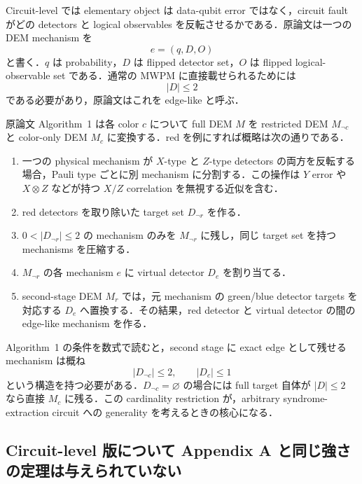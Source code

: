 \documentclass[a4paper,11pt]{ltjsarticle}
\begin{document}
Circuit-level では elementary object は data-qubit error ではなく，circuit fault がどの detectors と logical observables を反転させるかである．原論文は一つの DEM mechanism を
\begin{equation}
  e=(q,D,O)
\end{equation}
と書く．$q$ は probability，$D$ は flipped detector set，$O$ は flipped logical-observable set である．通常の MWPM に直接載せられるためには
\begin{equation}
  |D|\le 2
  \label{eq:edgelike}
\end{equation}
である必要があり，原論文はこれを edge-like と呼ぶ．

原論文 Algorithm~1 は各 color $c$ について full DEM $M$ を restricted DEM $M_{\neg c}$ と color-only DEM $M_c$ に変換する．red を例にすれば概略は次の通りである．

\begin{enumerate}
  \item 一つの physical mechanism が $X$-type と $Z$-type detectors の両方を反転する場合，Pauli type ごとに別 mechanism に分割する．この操作は $Y$ error や $X\otimes Z$ などが持つ $X/Z$ correlation を無視する近似を含む．
  \item red detectors を取り除いた target set $D_{\neg r}$ を作る．
  \item $0<|D_{\neg r}|\le 2$ の mechanism のみを $M_{\neg r}$ に残し，同じ target set を持つ mechanisms を圧縮する．
  \item $M_{\neg r}$ の各 mechanism $e$ に virtual detector $D_e$ を割り当てる．
  \item second-stage DEM $M_r$ では，元 mechanism の green/blue detector targets を対応する $D_e$ へ置換する．その結果，red detector と virtual detector の間の edge-like mechanism を作る．
\end{enumerate}

Algorithm~1 の条件を数式で読むと，second stage に exact edge として残せる mechanism は概ね
\begin{equation}
  |D_{\neg c}|\le 2,\qquad |D_c|\le 1
  \label{eq:circuit-cardinality}
\end{equation}
という構造を持つ必要がある．$D_{\neg c}=\varnothing$ の場合には full target 自体が $|D|\le2$ なら直接 $M_c$ に残る．この cardinality restriction が，arbitrary syndrome-extraction circuit への generality を考えるときの核心になる．

\subsection{Circuit-level 版について Appendix A と同じ強さの定理は与えられていない}
\end{document}
